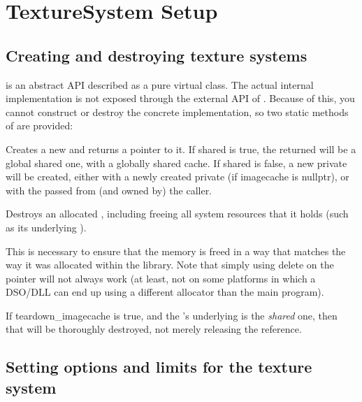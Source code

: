 \newpage
\section{TextureSystem Setup}
\label{sec:texturesys:api}

\subsection{Creating and destroying texture systems}
\label{sec:texturesys:api:createdestroy}

\TextureSystem is an abstract API described as a pure
virtual class.  The actual internal implementation is not exposed
through the external API of \product.  Because of this, you cannot
construct or destroy the concrete implementation, so two static
methods of \TextureSystem are provided:

Creates a new \TextureSystem and returns a pointer to it.
If {\cf shared} is {\cf true}, the \TextureSystem returned will be a global
shared one, with a globally shared cache. If {\cf shared} is {\cf false}, a
new private \TextureSystem will be created, either with a newly created
private \ImageCache (if {\cf imagecache} is {\cf nullptr}), or with the
\ImageCache passed from (and owned by) the caller.
\apiend

Destroys an allocated \TextureSystem, including freeing all system
resources that it holds (such as its underlying \ImageCache).

This is necessary to ensure that the memory is freed in a way that
matches the way it was allocated within the library.  Note that simply
using {\cf delete} on the pointer will not always work (at least,
not on some platforms in which a DSO/DLL can end up using a different
allocator than the main program).

If {\cf teardown_imagecache} is {\cf true}, and the \TextureSystem's
underlying \ImageCache is the \emph{shared} one, then that \ImageCache will
be thoroughly destroyed, not merely releasing the reference. \apiend

\subsection{Setting options and limits for the texture system}
\label{sec:texturesys:api:options}

